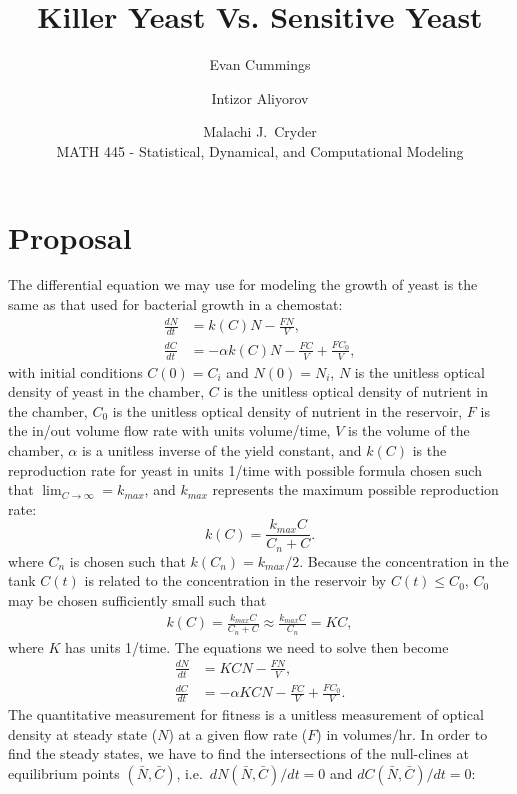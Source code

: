 


\small

\title{Killer Yeast Vs. Sensitive Yeast}
\author{Evan Cummings \and Intizor Aliyorov \and Malachi J.\ Cryder\\
MATH 445 - Statistical, Dynamical, and Computational Modeling}

\maketitle

\section*{Proposal}
The differential equation we may use for modeling the growth of yeast is the same as that used for bacterial growth in a chemostat:
\begin{align*}
  \frac{dN}{dt} &= k(C) N - \frac{FN}{V}, \\
  \frac{dC}{dt} &= -\alpha k(C) N - \frac{FC}{V} + \frac{FC_0}{V},
\end{align*}
with initial conditions $C(0) = C_i$ and $N(0) = N_i$, $N$ is the unitless optical density of yeast in the chamber, $C$ is the unitless optical density of nutrient in the chamber, $C_0$ is the unitless optical density of nutrient in the reservoir, $F$ is the in/out volume flow rate with units volume/time, $V$ is the volume of the chamber, $\alpha$ is a unitless inverse of the yield constant, and $k(C)$ is the reproduction rate for yeast in units 1/time with possible formula chosen such that $\lim_{C \rightarrow \infty} = k_{max}$, and $k_{max}$ represents the maximum possible reproduction rate:
$$k(C) = \frac{k_{max} C}{C_n + C}.$$
where $C_n$ is chosen such that $k(C_n) = k_{max} / 2$.  Because the concentration in the tank $C(t)$ is related to the concentration in the reservoir by $C(t) \leq C_0$, $C_0$ may be chosen sufficiently small such that 
\begin{align*}
  k(C) = \frac{k_{max} C}{C_n + C} \approx \frac{k_{max} C}{C_n} = KC,
\end{align*}
where $K$ has units 1/time. The equations we need to solve then become 
\begin{align}
  \frac{dN}{dt} &= KCN - \frac{FN}{V}, \\
  \frac{dC}{dt} &= -\alpha KCN - \frac{FC}{V} + \frac{FC_0}{V}.
\end{align}
The quantitative measurement for fitness is a unitless measurement of optical density at steady state ($N$) at a given flow rate ($F$) in volumes/hr.  In order to find the steady states, we have to find the intersections of the null-clines at equilibrium points $(\bar{N}, \bar{C})$, i.e.\ $dN(\bar{N},\bar{C})/dt = 0$ and $dC(\bar{N},\bar{C})/dt = 0$:
